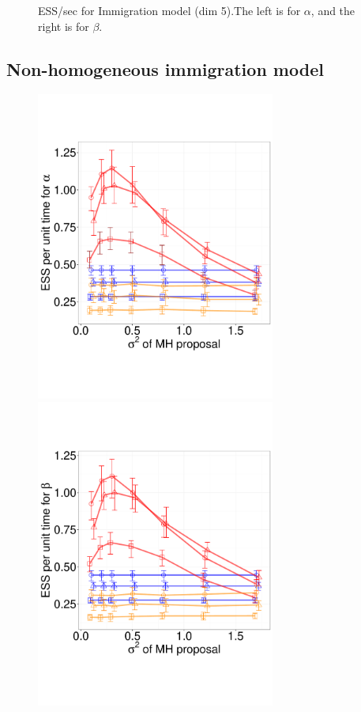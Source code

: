 \begin{figure}[H]
\begin{minipage}[hp]{0.45\linewidth}
    \vspace{-0 in}
      \label{fig:ESS_Q_D5}
  \end{minipage}
    \caption{ESS/sec for Immigration model (dim 5).The left is for $\alpha$, and the right is for $\beta$.}
  \end{figure}

\subsection{Non-homogeneous immigration model}

  \begin{figure}[H]
  \centering
  \begin{minipage}[!hp]{0.45\linewidth}
  \centering
    \includegraphics [width=0.70\textwidth, angle=0]{figs/pc_5_alpha.pdf}
      \end{minipage}
  \begin{minipage}[!hp]{0.45\linewidth}
  \centering
    \includegraphics [width=0.70\textwidth, angle=0]{figs/pc_5_beta.pdf}

\end{minipage}
\end{figure}
